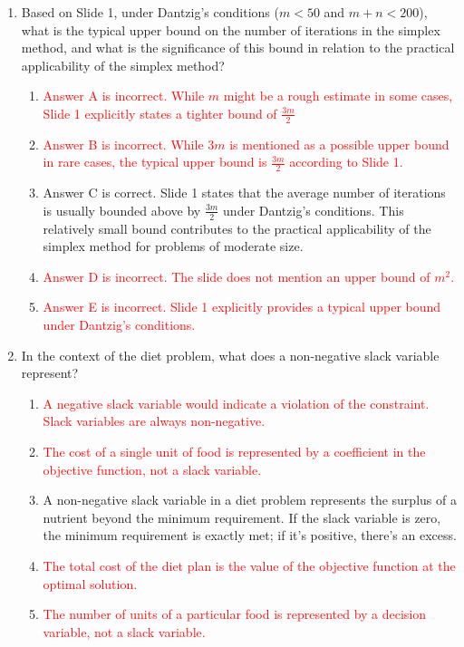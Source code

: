\documentclass{article}%
\newcommand{\incorrect}[1]{\textcolor{red}{#1}}
\begin{document}
\begin{enumerate}
\item Based on Slide 1, under Dantzig's conditions ($m < 50$ and $m + n < 200$), what is the typical upper bound on the number of iterations in the simplex method, and what is the significance of this bound in relation to the practical applicability of the simplex method?%
\begin{enumerate}%
\item \incorrect{Answer A is incorrect. While $m$ might be a rough estimate in some cases, Slide 1 explicitly states a tighter bound of $\frac{3m}{2}$}%
\item \incorrect{Answer B is incorrect.  While $3m$ is mentioned as a possible upper bound in rare cases, the typical upper bound is $\frac{3m}{2}$ according to Slide 1.}%
\item Answer C is correct. Slide 1 states that the average number of iterations is usually bounded above by $\frac{3m}{2}$ under Dantzig's conditions. This relatively small bound contributes to the practical applicability of the simplex method for problems of moderate size.%
\item \incorrect{Answer D is incorrect. The slide does not mention an upper bound of $m^2$.}%
\item \incorrect{Answer E is incorrect. Slide 1 explicitly provides a typical upper bound under Dantzig's conditions.}%
\end{enumerate}%
\vspace{1em}%
\item In the context of the diet problem, what does a non-negative slack variable represent?%
\begin{enumerate}%
\item \incorrect{A negative slack variable would indicate a violation of the constraint.  Slack variables are always non-negative.}%
\item \incorrect{The cost of a single unit of food is represented by a coefficient in the objective function, not a slack variable.}%
\item A non-negative slack variable in a diet problem represents the surplus of a nutrient beyond the minimum requirement.  If the slack variable is zero, the minimum requirement is exactly met; if it's positive, there's an excess.%
\item \incorrect{The total cost of the diet plan is the value of the objective function at the optimal solution.}%
\item \incorrect{The number of units of a particular food is represented by a decision variable, not a slack variable.}%

\end{enumerate}
\end{enumerate}
\end{document}

